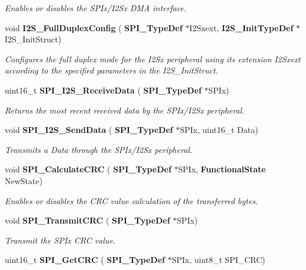 \begin{DoxyCompactItemize}
\begin{DoxyCompactList}\small\item\em Enables or disables the S\+P\+Ix/\+I2\+Sx D\+MA interface. \end{DoxyCompactList}\item 
void \textbf{ I2\+S\+\_\+\+Full\+Duplex\+Config} (\textbf{ S\+P\+I\+\_\+\+Type\+Def} $\ast$I2\+Sxext, \textbf{ I2\+S\+\_\+\+Init\+Type\+Def} $\ast$I2\+S\+\_\+\+Init\+Struct)
\begin{DoxyCompactList}\small\item\em Configures the full duplex mode for the I2\+Sx peripheral using its extension I2\+Sxext according to the specified parameters in the I2\+S\+\_\+\+Init\+Struct. \end{DoxyCompactList}\item 
uint16\+\_\+t \textbf{ S\+P\+I\+\_\+\+I2\+S\+\_\+\+Receive\+Data} (\textbf{ S\+P\+I\+\_\+\+Type\+Def} $\ast$S\+P\+Ix)
\begin{DoxyCompactList}\small\item\em Returns the most recent received data by the S\+P\+Ix/\+I2\+Sx peripheral. \end{DoxyCompactList}\item 
void \textbf{ S\+P\+I\+\_\+\+I2\+S\+\_\+\+Send\+Data} (\textbf{ S\+P\+I\+\_\+\+Type\+Def} $\ast$S\+P\+Ix, uint16\+\_\+t Data)
\begin{DoxyCompactList}\small\item\em Transmits a Data through the S\+P\+Ix/\+I2\+Sx peripheral. \end{DoxyCompactList}\item 
void \textbf{ S\+P\+I\+\_\+\+Calculate\+C\+RC} (\textbf{ S\+P\+I\+\_\+\+Type\+Def} $\ast$S\+P\+Ix, \textbf{ Functional\+State} New\+State)
\begin{DoxyCompactList}\small\item\em Enables or disables the C\+RC value calculation of the transferred bytes. \end{DoxyCompactList}\item 
void \textbf{ S\+P\+I\+\_\+\+Transmit\+C\+RC} (\textbf{ S\+P\+I\+\_\+\+Type\+Def} $\ast$S\+P\+Ix)
\begin{DoxyCompactList}\small\item\em Transmit the S\+P\+Ix C\+RC value. \end{DoxyCompactList}\item 
uint16\+\_\+t \textbf{ S\+P\+I\+\_\+\+Get\+C\+RC} (\textbf{ S\+P\+I\+\_\+\+Type\+Def} $\ast$S\+P\+Ix, uint8\+\_\+t S\+P\+I\+\_\+\+C\+RC)

\end{DoxyCompactItemize}
